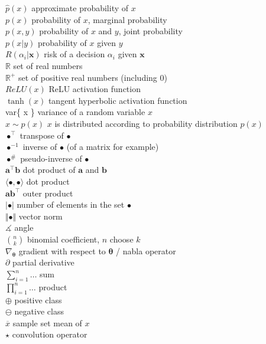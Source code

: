 \documentclass[12pt]{article}
\begin{document}
\begin{tabbing}
	\> $\widehat{p}(x)$								\>	approximate probability of $x$							\\[3mm]
	\> $p(x)$										\>	probability of $x$, marginal probability						\\[3mm]
	\> $p(x, y)$									\>	probability of $x$ and $y$, joint probability					\\[3mm]
	\> $p(x \vert y)$								\>	probability of $x$ given $y$								\\[3mm]
	\> $R(\alpha_i \vert \bm{x})$						\>	risk of a decision $\alpha_i$ given $\bm{x}$					\\[3mm]
	\> $\mathbb{R}$								\>	set of real numbers									\\[3mm]
	\> $\mathbb{R}^+$								\>	set of positive real numbers (including 0)						\\[3mm]
	\> $ReLU(x)$									\>	ReLU activation function								\\[3mm]
	\> $\tanh(x)$									\>	tangent hyperbolic activation function						\\[3mm]
	\> var\{ x \}									\>	variance of a random variable $x$							\\[3mm]
	\> $x \sim p(x)$									\>	$x$ is distributed according to probability distribution $p(x)$		\\[3mm]
	\> $\bullet^{\intercal}$							\>	transpose of $\bullet$									\\[3mm]
	\> $\bullet^{-1}$								\>	inverse of $\bullet$ (of a matrix for example)					\\[3mm]
	\> $\bullet^{\#}$								\>	pseudo-inverse of $\bullet$								\\[3mm]
	\> $\bm{a}^{\intercal}\bm{b}$						\>	dot product of $\bm{a}$ and $\bm{b}$						\\[3mm]
	\> $\langle \bullet, \bullet \rangle$					\>	dot product										\\[3mm]
	\> $\bm{a}\bm{b}^{\intercal}$						\>	outer product										\\[3mm]
	\> $\vert \bullet \vert$							\>	number of elements in the set $\bullet$						\\[3mm]
	\> $\Vert \bullet \Vert$							\>	vector norm										\\[3mm]
	\> $\measuredangle$								\>	angle												\\[3mm]
	\> $\binom{n}{k}$								\>	binomial coefficient, $n$ choose $k$						\\[3mm]
	\> $\nabla_{\bm{\theta}}$							\>	gradient with respect to $\bm{\theta}$ / nabla operator			\\[3mm]	
	\> $\partial$									\>	partial derivative										\\[3mm]
	\> $\sum_{i=1}^n \dots$							\>	sum												\\[3mm]
	\> $\prod_{i=1}^n \dots$							\>	product											\\[3mm]
	\> $\oplus$									\>	positive class										\\[3mm]
	\> $\ominus$									\>	negative class										\\[3mm]
	\> $\overline{x}$								\>	sample set mean of $x$								\\[3mm]
	\> $\star$										\>	convolution operator
\end{tabbing}
\end{document}
